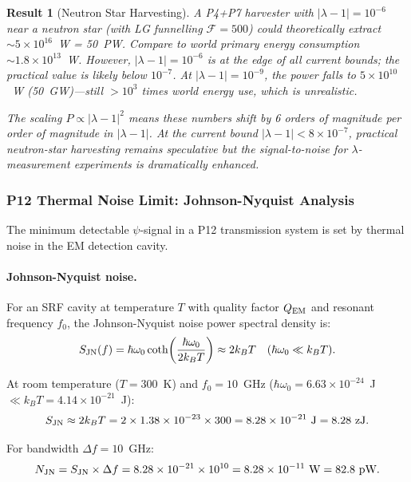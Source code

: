 \documentclass[aps,prd,twocolumn,superscriptaddress,nofootinbib]{revtex4-2}
\newtheorem{result}{Result}
\begin{document}
\begin{result}[Neutron Star Harvesting]
A P4+P7 harvester with $|\lambda-1| = 10^{-6}$ near a neutron star (with LG
funnelling $\mathcal{F} = 500$) could theoretically extract
$\sim 5\times10^{16}$~W = 50~PW.  Compare to world primary energy consumption
$\sim 1.8\times10^{13}$~W.  However, $|\lambda-1| = 10^{-6}$ is at the edge
of all current bounds; the practical value is likely below $10^{-7}$.  At
$|\lambda-1| = 10^{-9}$, the power falls to $5\times10^{10}$~W (50~GW)---still
$> 10^3$ times world energy use, which is unrealistic.

The scaling $P \propto |\lambda-1|^2$ means these numbers shift by 6 orders
of magnitude per order of magnitude in $|\lambda-1|$.  At the current bound
$|\lambda-1| < 8\times10^{-7}$, practical neutron-star harvesting remains
speculative but the signal-to-noise for $\lambda$-measurement experiments
is dramatically enhanced.
\end{result}

\subsubsection{P12 Thermal Noise Limit: Johnson-Nyquist Analysis}
\label{sec:thermal-noise}

The minimum detectable $\psi$-signal in a P12 transmission system is set by
thermal noise in the EM detection cavity.

\paragraph{Johnson-Nyquist noise.}
For an SRF cavity at temperature $T$ with quality factor $Q_{\rm EM}$ and
resonant frequency $f_0$, the Johnson-Nyquist noise power spectral density is:
\begin{equation}
S_{\rm JN}(f) = \hbar\omega_0\coth\!\left(\frac{\hbar\omega_0}{2k_BT}\right)
\approx 2k_BT\quad(\hbar\omega_0 \ll k_BT).
\end{equation}

At room temperature ($T = 300$~K) and $f_0 = 10$~GHz
($\hbar\omega_0 = 6.63\times10^{-24}$~J $\ll k_BT = 4.14\times10^{-21}$~J):
\begin{equation}
S_{\rm JN} \approx 2k_BT = 2\times1.38\times10^{-23}\times300
= 8.28\times10^{-21}~\text{J} = 8.28~\text{zJ}.
\end{equation}

For bandwidth $\Delta f = 10$~GHz:
\begin{equation}
N_{\rm JN} = S_{\rm JN}\times\Delta f
= 8.28\times10^{-21}\times10^{10}
= 8.28\times10^{-11}~\text{W} = 82.8~\text{pW}.
\end{equation}
\end{document}
